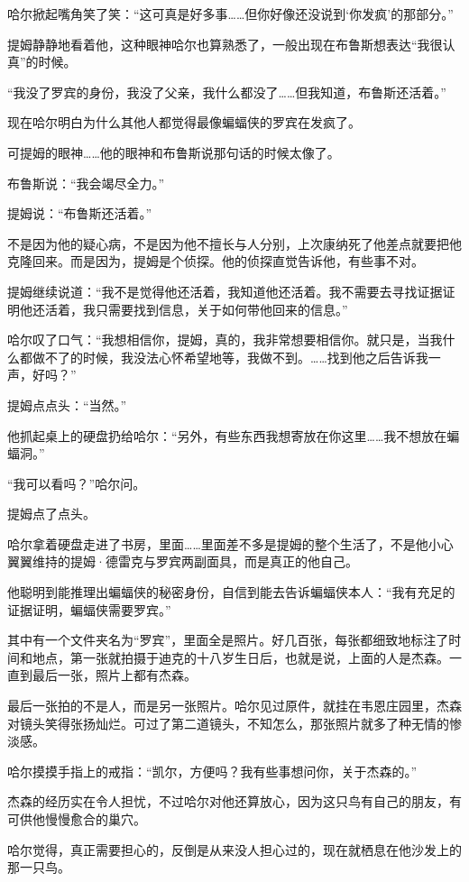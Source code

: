 \documentclass[../main]{subfiles}
\begin{document}
哈尔掀起嘴角笑了笑：“这可真是好多事……但你好像还没说到‘你发疯’的那部分。”

提姆静静地看着他，这种眼神哈尔也算熟悉了，一般出现在布鲁斯想表达“我很认真”的时候。

“我没了罗宾的身份，我没了父亲，我什么都没了……但我知道，布鲁斯还活着。”

现在哈尔明白为什么其他人都觉得最像蝙蝠侠的罗宾在发疯了。

可提姆的眼神……他的眼神和布鲁斯说那句话的时候太像了。

布鲁斯说：“我会竭尽全力。”

提姆说：“布鲁斯还活着。”

不是因为他的疑心病，不是因为他不擅长与人分别，上次康纳死了他差点就要把他克隆回来。而是因为，提姆是个侦探。他的侦探直觉告诉他，有些事不对。

提姆继续说道：“我不是觉得他还活着，我知道他还活着。我不需要去寻找证据证明他还活着，我只需要找到信息，关于如何带他回来的信息。”

哈尔叹了口气：“我想相信你，提姆，真的，我非常想要相信你。就只是，当我什么都做不了的时候，我没法心怀希望地等，我做不到。……找到他之后告诉我一声，好吗？”

提姆点点头：“当然。”

他抓起桌上的硬盘扔给哈尔：“另外，有些东西我想寄放在你这里……我不想放在蝙蝠洞。”

“我可以看吗？”哈尔问。

提姆点了点头。

哈尔拿着硬盘走进了书房，里面……里面差不多是提姆的整个生活了，不是他小心翼翼维持的提姆·德雷克与罗宾两副面具，而是真正的他自己。

他聪明到能推理出蝙蝠侠的秘密身份，自信到能去告诉蝙蝠侠本人：“我有充足的证据证明，蝙蝠侠需要罗宾。”

其中有一个文件夹名为“罗宾”，里面全是照片。好几百张，每张都细致地标注了时间和地点，第一张就拍摄于迪克的十八岁生日后，也就是说，上面的人是杰森。一直到最后一张，照片上都有杰森。

最后一张拍的不是人，而是另一张照片。哈尔见过原件，就挂在韦恩庄园里，杰森对镜头笑得张扬灿烂。可过了第二道镜头，不知怎么，那张照片就多了种无情的惨淡感。

哈尔摸摸手指上的戒指：“凯尔，方便吗？我有些事想问你，关于杰森的。”

杰森的经历实在令人担忧，不过哈尔对他还算放心，因为这只鸟有自己的朋友，有可供他慢慢愈合的巢穴。

哈尔觉得，真正需要担心的，反倒是从来没人担心过的，现在就栖息在他沙发上的那一只鸟。
\end{document}
